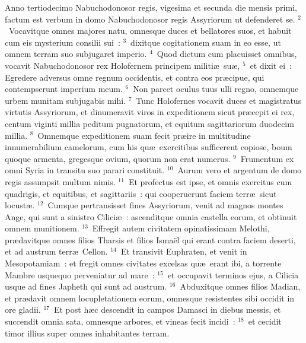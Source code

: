 \bchapter
\lettrine[lines=3,image=true,loversize=0.05,lraise=-0.03]{A}{}nno tertiodecimo Nabuchodonosor regis, vigesima et secunda die mensis primi, factum est verbum in domo Nabuchodonosor regis Assyriorum ut defenderet se.
${}^{2}$~Vocavitque omnes majores natu, omnesque duces et bellatores suos, et habuit cum eis mysterium consilii sui~:
${}^{3}$~dixitque cogitationem suam in eo esse, ut omnem terram suo subjugaret imperio.
${}^{4}$~Quod dictum cum placuisset omnibus, vocavit Nabuchodonosor rex Holofernem principem militi\ae\ su\ae ,
${}^{5}$~et dixit ei~: Egredere adversus omne regnum occidentis, et contra eos pr\ae cipue, qui contempserunt imperium meum.
${}^{6}$~Non parcet oculus tuus ulli regno, omnemque urbem munitam subjugabis mihi.
${}^{7}$~Tunc Holofernes vocavit duces et magistratus virtutis Assyriorum, et dinumeravit viros in expeditionem sicut pr\ae cepit ei rex, centum viginti millia peditum pugnatorum, et equitum sagittariorum duodecim millia.
${}^{8}$~Omnemque expeditionem suam fecit pr\ae ire in multitudine innumerabilium camelorum, cum his qu\ae\ exercitibus sufficerent copiose, boum quoque armenta, gregesque ovium, quorum non erat numerus.
${}^{9}$~Frumentum ex omni Syria in transitu suo parari constituit.
${}^{10}$~Aurum vero et argentum de domo regis assumpsit multum nimis.
${}^{11}$~Et profectus est ipse, et omnis exercitus cum quadrigis, et equitibus, et sagittariis~: qui cooperuerunt faciem terr\ae\ sicut locust\ae .
${}^{12}$~Cumque pertransisset fines Assyriorum, venit ad magnos montes Ange, qui sunt a sinistro Cilici\ae~: ascenditque omnia castella eorum, et obtinuit omnem munitionem.
${}^{13}$~Effregit autem civitatem opinatissimam Melothi, pr\ae davitque omnes filios Tharsis et filios Isma\"el qui erant contra faciem deserti, et ad austrum terr\ae\ Cellon.
${}^{14}$~Et transivit Euphraten, et venit in Mesopotamiam~: et fregit omnes civitates excelsas qu\ae\ erant ibi, a torrente Mambre usquequo perveniatur ad mare~:
${}^{15}$~et occupavit terminos ejus, a Cilicia usque ad fines Japheth qui sunt ad austrum.
${}^{16}$~Abduxitque omnes filios Madian, et pr\ae davit omnem locupletationem eorum, omnesque resistentes sibi occidit in ore gladii.
${}^{17}$~Et post h\ae c descendit in campos Damasci in diebus messis, et succendit omnia sata, omnesque arbores, et vineas fecit incidi~:
${}^{18}$~et cecidit timor illius super omnes inhabitantes terram.

